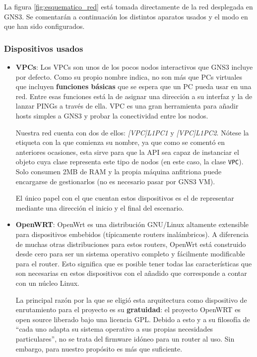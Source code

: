 La figura \ref{fig:esquematico_red} está tomada directamente de la red desplegada en GNS3. Se comentarán a continuación los distintos aparatos usados y el modo en que han sido configurados.

\subsubsection{Dispositivos usados}
\begin{itemize}
\item \textbf{VPCs}: Los VPCs son unos de los pocos nodos interactivos que GNS3 incluye por defecto. Como su propio nombre indica, no son más que PCs virtuales que incluyen \textbf{funciones básicas} que se espera que un PC pueda usar en una red. Entre esas funciones está la de asignar una dirección a su interfaz y la de lanzar PINGs a través de ella. VPC es una gran herramienta para añadir hosts simples a GNS3 y probar la conectividad entre los nodos\cite{bookgns}.

Nuestra red cuenta con dos de ellos: \textit{[VPC]L1PC1} y \textit{[VPC]L1PC2}. Nótese la etiqueta con la que comienza su nombre, ya que como se comentó en anteriores ocasiones, esta sirve para que la API sea capaz de instanciar el objeto cuya clase representa este tipo de nodos (en este caso, la clase \texttt{VPC}). Solo consumen 2MB de RAM y la propia máquina anfitriona puede encargarse de gestionarlos (no es necesario pasar por GNS3 VM).

El único papel con el que cuentan estos dispositivos es el de representar mediante una dirección el inicio y el final del escenario.

\item \textbf{OpenWRT}: OpenWrt es una distribución GNU/Linux altamente extensible para dispositivos embebidos (típicamente routers inalámbricos). A diferencia de muchas otras distribuciones para estos routers, OpenWrt está construido desde cero para ser un sistema operativo completo y fácilmente modificable para el router. Esto significa que es posible tener todas las características que son necesarias en estos dispositivos con el añadido que corresponde a contar con un núcleo Linux\cite{aboutopenwrt}.

La principal razón por la que se eligió esta arquitectura como dispositivo de enrutamiento para el proyecto es su \textbf{gratuidad}: el proyecto OpenWRT es open source liberado bajo una licencia GPL. Debido a esto y a su filosofía de ``cada uno adapta su sistema operativo a sus propias necesidades particulares'', no se trata del firmware idóneo para un router al uso. Sin embargo, para nuestro propósito es más que suficiente.


\end{itemize}
